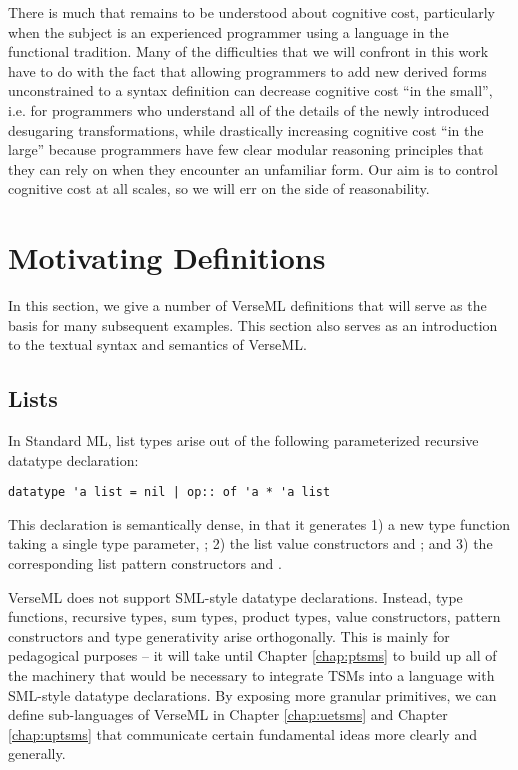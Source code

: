 There is much that remains to be understood about cognitive cost, particularly when the subject is an experienced programmer using a language in the functional tradition. Many of the difficulties that we will confront in this work have to do with the fact that allowing programmers to add new derived forms unconstrained to a syntax definition can decrease cognitive cost ``in the small'', i.e. for programmers who understand all of the details of the newly introduced desugaring transformations, while drastically increasing cognitive cost ``in the large'' because programmers have few clear modular reasoning principles that they can rely on when they encounter an unfamiliar form. Our aim is to control cognitive cost at all scales, so we will err on the side of reasonability. %



\section{Motivating Definitions}\label{sec:motivating-examples}
In this section, we give a number of VerseML definitions that will serve as the basis for many subsequent examples. This section also serves as an introduction to the textual syntax and semantics of VerseML.

\subsection{Lists}\label{sec:lists}
In Standard ML, list types arise out of the following parameterized recursive datatype declaration:
\begin{lstlisting}[numbers=none]
datatype 'a list = nil | op:: of 'a * 'a list
\end{lstlisting}
This declaration is semantically dense, in that it generates 1) a new type function  taking a single type parameter, ; 2) the list value constructors  and ; and 3) the corresponding list pattern constructors  and .

VerseML does not support SML-style datatype declarations. Instead, type functions, recursive types, sum types, product types, value constructors, pattern constructors and type generativity arise orthogonally. This is mainly for pedagogical purposes -- it will take until Chapter \ref{chap:ptsms} to build up all of the machinery that would be necessary to integrate TSMs into a language with SML-style datatype declarations. By exposing more granular primitives, we can define sub-languages of VerseML in Chapter \ref{chap:uetsms} and Chapter \ref{chap:uptsms} that communicate certain fundamental ideas more clearly and generally.

